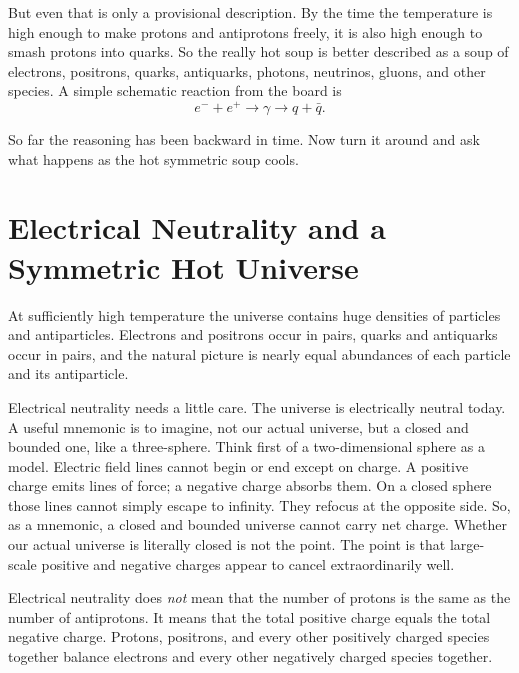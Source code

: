 But even that is only a provisional description. By the time the temperature is high enough to make protons and antiprotons freely, it is also high enough to smash protons into quarks. So the really hot soup is better described as a soup of electrons, positrons, quarks, antiquarks, photons, neutrinos, gluons, and other species. A simple schematic reaction from the board is
\[
e^- + e^+ \to \gamma \to q + \bar q.
\]

\begin{classroomqa}
\end{classroomqa}

So far the reasoning has been backward in time. Now turn it around and ask what happens as the hot symmetric soup cools.

\section{Electrical Neutrality and a Symmetric Hot Universe}

At sufficiently high temperature the universe contains huge densities of particles and antiparticles. Electrons and positrons occur in pairs, quarks and antiquarks occur in pairs, and the natural picture is nearly equal abundances of each particle and its antiparticle.

Electrical neutrality needs a little care. The universe is electrically neutral today. A useful mnemonic is to imagine, not our actual universe, but a closed and bounded one, like a three-sphere. Think first of a two-dimensional sphere as a model. Electric field lines cannot begin or end except on charge. A positive charge emits lines of force; a negative charge absorbs them. On a closed sphere those lines cannot simply escape to infinity. They refocus at the opposite side. So, as a mnemonic, a closed and bounded universe cannot carry net charge. Whether our actual universe is literally closed is not the point. The point is that large-scale positive and negative charges appear to cancel extraordinarily well.

Electrical neutrality does \emph{not} mean that the number of protons is the same as the number of antiprotons. It means that the total positive charge equals the total negative charge. Protons, positrons, and every other positively charged species together balance electrons and every other negatively charged species together.

